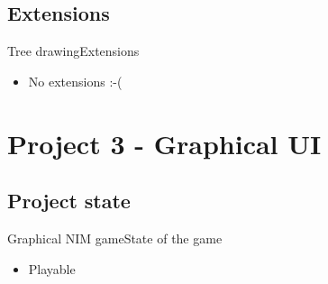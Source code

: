 \documentclass{beamer}
\begin{document}
\subsection{Extensions}
\begin{frame}{Tree drawing}{Extensions}
  \begin{itemize}
  \item {
    No extensions :-(
  }
  \end{itemize}
\end{frame}

\section{Project 3 - Graphical UI}
\subsection{Project state}
\begin{frame}{Graphical NIM game}{State of the game}
  \begin{itemize}
  \item {
    Playable
  }
  \end{itemize}
\end{frame}
\end{document}
